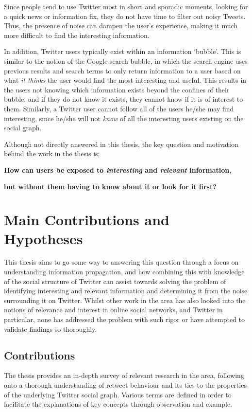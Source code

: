 Since people tend to use Twitter most in short and sporadic moments, looking for a quick news or information fix, they do not have time to filter out noisy Tweets. Thus, the presence of noise can dampen the user's experience, making it much more difficult to find the interesting information.

In addition, Twitter users typically exist within an information `bubble'. This is similar to the notion of the Google search bubble, in which the search engine uses previous results and search terms to only return information to a user based on what \textit{it thinks} the user would find the most interesting and useful. This results in the users not knowing which information exists beyond the confines of their bubble, and if they do not know it exists, they cannot know if it is of interest to them. Similarly, a Twitter user cannot follow all of the users he/she may find interesting, since he/she will not \textit{know} of all the interesting users existing on the social graph.

Although not directly answered in this thesis, the key question and motivation behind the work in the thesis is;\\
\centerline{\textbf{How can users be exposed to \textit{interesting} and \textit{relevant} information,}}
\centerline{\textbf{but without them having to know about it or look for it first?}}


\section{Main Contributions and Hypotheses}
This thesis aims to go some way to answering this question through a focus on understanding information propagation, and how combining this with knowledge of the social structure of Twitter can assist towards solving the problem of identifying interesting and relevant information and determining it from the noise surrounding it on Twitter. Whilst other work in the area has also looked into the notions of relevance and interest in online social networks, and Twitter in particular, none has addressed the problem with such rigor or have attempted to validate findings so thoroughly.

\subsection{Contributions}
The thesis provides an in-depth survey of relevant research in the area, following onto a thorough understanding of retweet behaviour and its ties to the properties of the underlying Twitter social graph. Various terms are defined in order to facilitate the explanations of key concepts through observation and example. 

